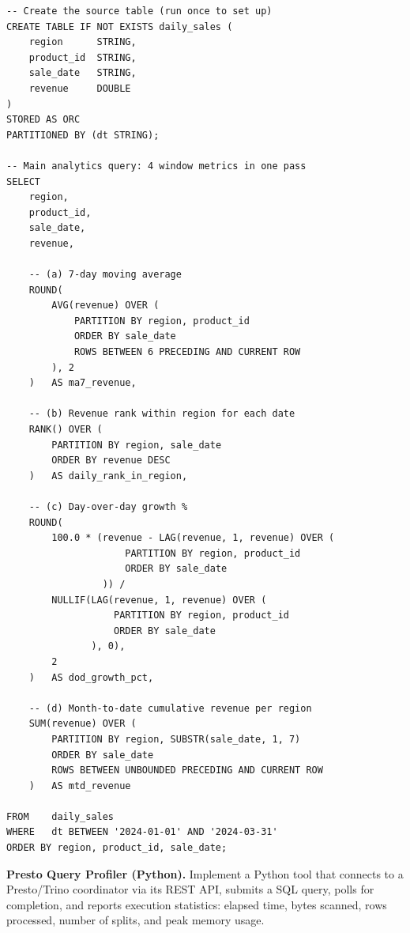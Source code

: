 \begin{lstlisting}[style=hiveql, caption={PE7.1: Window function analytics pipeline}]
-- Create the source table (run once to set up)
CREATE TABLE IF NOT EXISTS daily_sales (
    region      STRING,
    product_id  STRING,
    sale_date   STRING,
    revenue     DOUBLE
)
STORED AS ORC
PARTITIONED BY (dt STRING);

-- Main analytics query: 4 window metrics in one pass
SELECT
    region,
    product_id,
    sale_date,
    revenue,

    -- (a) 7-day moving average
    ROUND(
        AVG(revenue) OVER (
            PARTITION BY region, product_id
            ORDER BY sale_date
            ROWS BETWEEN 6 PRECEDING AND CURRENT ROW
        ), 2
    )   AS ma7_revenue,

    -- (b) Revenue rank within region for each date
    RANK() OVER (
        PARTITION BY region, sale_date
        ORDER BY revenue DESC
    )   AS daily_rank_in_region,

    -- (c) Day-over-day growth %
    ROUND(
        100.0 * (revenue - LAG(revenue, 1, revenue) OVER (
                     PARTITION BY region, product_id
                     ORDER BY sale_date
                 )) /
        NULLIF(LAG(revenue, 1, revenue) OVER (
                   PARTITION BY region, product_id
                   ORDER BY sale_date
               ), 0),
        2
    )   AS dod_growth_pct,

    -- (d) Month-to-date cumulative revenue per region
    SUM(revenue) OVER (
        PARTITION BY region, SUBSTR(sale_date, 1, 7)
        ORDER BY sale_date
        ROWS BETWEEN UNBOUNDED PRECEDING AND CURRENT ROW
    )   AS mtd_revenue

FROM    daily_sales
WHERE   dt BETWEEN '2024-01-01' AND '2024-03-31'
ORDER BY region, product_id, sale_date;
\end{lstlisting}

\pe \textbf{Presto Query Profiler (Python).}
Implement a Python tool that connects to a Presto/Trino coordinator via
its REST API, submits a SQL query, polls for completion, and reports
execution statistics: elapsed time, bytes scanned, rows processed,
number of splits, and peak memory usage.

